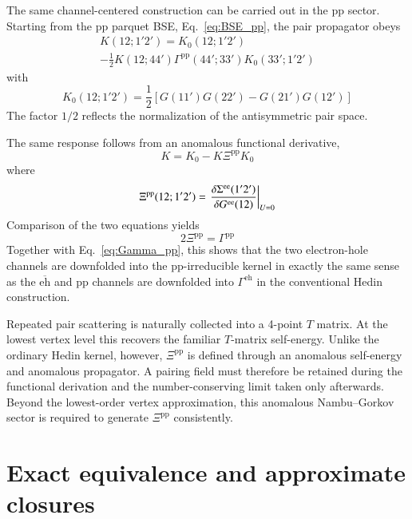 \documentclass[aip,jcp,reprint,noshowkeys,superscriptaddress]{revtex4-1}
\newcommand{\eh}{\text{eh}}
\newcommand{\ee}{\text{ee}}
\newcommand{\teh}{\overline{\text{eh}}}
\newcommand{\pp}{\text{pp}}
\begin{document}
The same channel-centered construction can be carried out in the $\pp$
sector.\cite{MarieRomanielloLoos2024,MarieRomanielloBlaseLoos2025}
Starting from the $\pp$ parquet BSE, Eq.~\eqref{eq:BSE_pp}, the pair
propagator obeys
\begin{multline}
	K(12;1'2')
	=
	K_0(12;1'2')
	\\
	-
	\frac{1}{2}
	K(12;44')
	\Gamma^\pp(44';33')
	K_0(33';1'2')
	\label{eq:K_parquet}
\end{multline}
with
\begin{equation}
	K_0(12;1'2')
	=
	\frac{1}{2}
	\left[
		G(11')G(22')
		-
		G(21')G(12')
	\right]
	\label{eq:K0_def}
\end{equation}
The factor $1/2$ reflects the normalization of the antisymmetric pair
space.

The same response follows from an anomalous functional derivative,
\begin{equation}
	K
	=
	K_0
	-
	K\Xi^\pp K_0
	\label{eq:K_pp_Hedin}
\end{equation}
where
\begin{equation}
	\Xi^\pp(12;1'2')
	=
	\eval{
	\fdv{\Sigma^{\ee}(1'2')}{G^{\ee}(12)}
	}_{U=0}
	\label{eq:Xi_pp_def}
\end{equation}
Comparison of the two equations yields
\begin{equation}
	2\Xi^\pp
	=
	\Gamma^\pp
	\label{eq:Xi_pp_parquet}
\end{equation}
Together with Eq.~\eqref{eq:Gamma_pp}, this shows that the two electron-hole
channels are downfolded into the $\pp$-irreducible kernel in exactly the
same sense as the $\teh$ and $\pp$ channels are downfolded into
$\Gamma^\eh$ in the conventional Hedin construction.

Repeated pair scattering is naturally collected into a 4-point
$T$ matrix.\cite{MarieRomanielloLoos2024}
At the lowest vertex level this recovers the familiar $T$-matrix
self-energy.
Unlike the ordinary Hedin kernel, however, $\Xi^\pp$ is defined through
an anomalous self-energy and anomalous propagator.
A pairing field must therefore be retained during the functional
derivation and the number-conserving limit taken only afterwards.
Beyond the lowest-order vertex approximation, this anomalous
Nambu--Gorkov sector is required to generate $\Xi^\pp$ consistently.

\section{Exact equivalence and approximate closures}
\label{sec:approximations}
\end{document}
